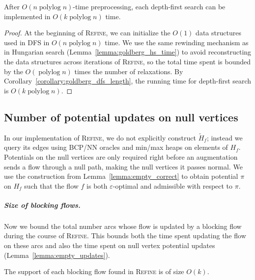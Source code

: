 \documentclass[a4paper,UKenglish]{socg-lipics-v2018}
\makeatletter
\def\note#1{\textcolor{red}{{#1}}}
\def\polylog{\mathop{\mathrm{polylog}}}
\def\eps{\varepsilon}
\theoremstyle{plain}
\numberwithin{figure}{section}
\renewcommand{\paragraph}{\subparagraph}
\def\n@te#1{\textsf{\boldmath \textbf{$\langle\!\langle$#1$\rangle\!\rangle$}}\leavevmode}
\def\note#1{\textcolor{red}{\n@te{#1}}}
\makeatother
\begin{document}
\begin{toappendix}
\begin{lemmarep}
\label{lemma:goldberg_dfs_time}
After $O(n \polylog n)$-time preprocessing,
each depth-first search can be implemented in $O(k \polylog n)$ time.
\end{lemmarep}

\begin{proof}
At the beginning of \textsc{Refine}, we can initialize the $O(1)$ data
structures used in \textsc{DFS} in $O(n\polylog n)$ time.
We use the same rewinding mechanism as in Hungarian search
(Lemma~\ref{lemma:goldberg_hs_time}) to avoid reconstructing the data
structures across iterations of \textsc{Refine}, so the total time spent
is bounded by the $O(\polylog n)$ times the number of relaxations.
By Corollary~\ref{corollary:goldberg_dfs_length}, the running time for depth-first search is $O(k\polylog n)$.
\end{proof}

\subsection{Number of potential updates on null vertices}
\label{SSA:null-potential-update}

In our implementation of \textsc{Refine}, we do not explicitly construct $\tilde{H}_f$; instead we query its edges using BCP/NN
oracles and min/max heaps on elements of $H_f$.
Potentials on the null vertices are only required right before an augmentation sends a flow through a
null path, making the null vertices it passes normal.
We use the construction from Lemma~\ref{lemma:empty_correct}
to obtain potential $\pi$ on $H_f$ such that the flow $f$ is both $\eps$-optimal and admissible with respect to $\pi$.

\paragraph{Size of blocking flows.}

Now we bound the total number arcs whose flow is updated by a blocking flow during the course of \textsc{Refine}.
This bounds both the time spent updating the flow on these arcs and also the time spent on null vertex potential updates
(Lemma~\ref{lemma:empty_updates}).

\begin{lemmarep}
\label{lemma:goldberg_bf_size}
The support of each blocking flow %
found in \textsc{Refine} is of size $O(k)$.
\end{lemmarep}


\end{toappendix}
\end{document}
